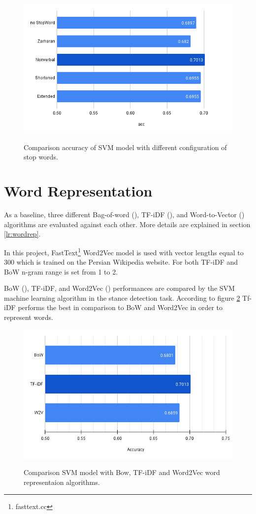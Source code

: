 \begin{figure}%
	\centering
	{\includegraphics[width=12.5cm]{statistics/AccuracyScore.png} }
	\caption{Comparison accuracy of SVM model with different configuration of stop words.}%
	\label{fig:stopwords}%
\end{figure}

\section{Word Representation}
As a baseline, three different Bag-of-word (\cite{bow}), TF-iDF (\cite{tfidf}), and Word-to-Vector (\cite{word2vec}) algorithms are evaluated against each other. More details are explained in section \ref{lr:wordrep}.

In this project, FastText\footnote{fasttext.cc} Word2Vec model is used with vector lengths equal to 300 which is trained on the Persian Wikipedia website. For both TF-iDF and BoW n-gram range is set from 1 to 2. 

BoW (\cite{bow}), TF-iDF, and Word2Vec (\cite{word2vec}) performances are compared by the SVM machine learning algorithm in the stance detection task. According to figure \ref{fig:wordrep} Tf-iDF performs the best in comparison to BoW and Word2Vec in order to represent words.
\begin{figure}%
	\centering
	{\includegraphics[width=12.5cm]{statistics/WordRep.png} }
	\caption{Comparison SVM model with Bow, TF-iDF and Word2Vec word representaion algorithms.}%
	\label{fig:wordrep}%
\end{figure}

